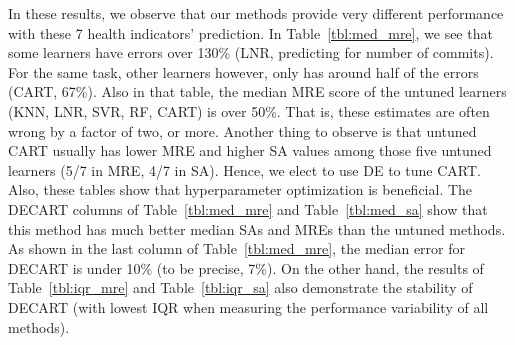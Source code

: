 \documentclass[sigconf,review,anonymous]{acmart}
\begin{document}
In these results, we observe that our methods provide very different performance with these 7 health indicators' prediction. In Table~\ref{tbl:med_mre}, we see that some learners have errors over 130\% (LNR, predicting for number of commits). For the same task, other learners however, only has around half of the errors (CART, 67\%).
Also in that   table, the median MRE score of the untuned learners (KNN, LNR, SVR, RF, CART) is over 50\%. That is,  these estimates are often wrong by a factor of two, or more.
Another thing to observe is that untuned CART usually has lower MRE and higher SA values among those five untuned learners (5/7 in MRE, 4/7 in SA). Hence, we elect to use DE to tune CART. 
Also, these tables show that   hyperparameter optimization is   beneficial.
The  DECART columns of Table~\ref{tbl:med_mre} and Table~\ref{tbl:med_sa} show that this method has much better median SAs and MREs than the untuned methods. As shown in the last column of Table~\ref{tbl:med_mre}, the median error for DECART is under 10\% (to be precise, 7\%). On the other hand, the results of Table~\ref{tbl:iqr_mre} and Table~\ref{tbl:iqr_sa} also demonstrate the stability of DECART (with lowest IQR when measuring the performance variability of all methods).

\end{document}

